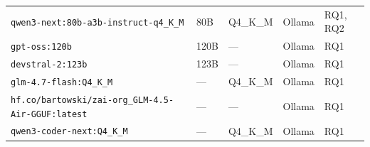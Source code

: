 \begin{table}[t]
{\begin{tabular}{lllll}
\texttt{qwen3-next:80b-a3b-instruct-q4\_K\_M} & 80B & Q4\_K\_M & Ollama & RQ1, RQ2 \\
\texttt{gpt-oss:120b} & 120B & --- & Ollama & RQ1 \\
\texttt{devstral-2:123b} & 123B & --- & Ollama & RQ1 \\
\texttt{glm-4.7-flash:Q4\_K\_M} & --- & Q4\_K\_M & Ollama & RQ1 \\
\texttt{hf.co/bartowski/zai-org\_GLM-4.5-Air-GGUF:latest} & --- & --- & Ollama & RQ1 \\
\texttt{qwen3-coder-next:Q4\_K\_M} & --- & Q4\_K\_M & Ollama & RQ1 \\
\bottomrule
\end{tabular}}
\end{table}
